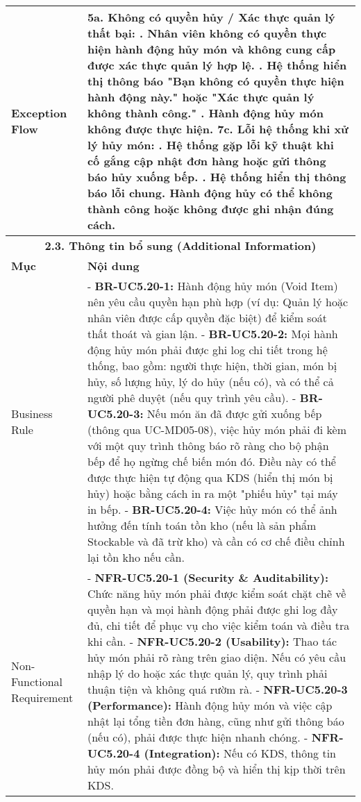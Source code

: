 \begin{longtable}{|m{4cm}|p{11cm}|}
\hline
Exception Flow & \textbf{5a. Không có quyền hủy / Xác thực quản lý thất bại:} \newline    1. Nhân viên không có quyền thực hiện hành động hủy món và không cung cấp được xác thực quản lý hợp lệ. \newline    2. Hệ thống hiển thị thông báo "Bạn không có quyền thực hiện hành động này." hoặc "Xác thực quản lý không thành công." \newline    3. Hành động hủy món không được thực hiện. \newline \textbf{7c. Lỗi hệ thống khi xử lý hủy món:} \newline    1. Hệ thống gặp lỗi kỹ thuật khi cố gắng cập nhật đơn hàng hoặc gửi thông báo hủy xuống bếp. \newline    2. Hệ thống hiển thị thông báo lỗi chung. Hành động hủy có thể không thành công hoặc không được ghi nhận đúng cách. \\
\hline
\multicolumn{2}{|c|}{\textbf{2.3. Thông tin bổ sung (Additional Information)}} \\
\hline
\textbf{Mục} & \textbf{Nội dung} \\
\hline
Business Rule & - \textbf{BR-UC5.20-1:} Hành động hủy món (Void Item) nên yêu cầu quyền hạn phù hợp (ví dụ: Quản lý hoặc nhân viên được cấp quyền đặc biệt) để kiểm soát thất thoát và gian lận. \newline - \textbf{BR-UC5.20-2:} Mọi hành động hủy món phải được ghi log chi tiết trong hệ thống, bao gồm: người thực hiện, thời gian, món bị hủy, số lượng hủy, lý do hủy (nếu có), và có thể cả người phê duyệt (nếu quy trình yêu cầu). \newline - \textbf{BR-UC5.20-3:} Nếu món ăn đã được gửi xuống bếp (thông qua UC-MD05-08), việc hủy món phải đi kèm với một quy trình thông báo rõ ràng cho bộ phận bếp để họ ngừng chế biến món đó. Điều này có thể được thực hiện tự động qua KDS (hiển thị món bị hủy) hoặc bằng cách in ra một "phiếu hủy" tại máy in bếp. \newline - \textbf{BR-UC5.20-4:} Việc hủy món có thể ảnh hưởng đến tính toán tồn kho (nếu là sản phẩm Stockable và đã trừ kho) và cần có cơ chế điều chỉnh lại tồn kho nếu cần. \\
\hline
Non-Functional Requirement & - \textbf{NFR-UC5.20-1 (Security \& Auditability):} Chức năng hủy món phải được kiểm soát chặt chẽ về quyền hạn và mọi hành động phải được ghi log đầy đủ, chi tiết để phục vụ cho việc kiểm toán và điều tra khi cần. \newline - \textbf{NFR-UC5.20-2 (Usability):} Thao tác hủy món phải rõ ràng trên giao diện. Nếu có yêu cầu nhập lý do hoặc xác thực quản lý, quy trình phải thuận tiện và không quá rườm rà. \newline - \textbf{NFR-UC5.20-3 (Performance):} Hành động hủy món và việc cập nhật lại tổng tiền đơn hàng, cũng như gửi thông báo (nếu có), phải được thực hiện nhanh chóng. \newline - \textbf{NFR-UC5.20-4 (Integration):} Nếu có KDS, thông tin hủy món phải được đồng bộ và hiển thị kịp thời trên KDS. \\
\hline
\end{longtable}

